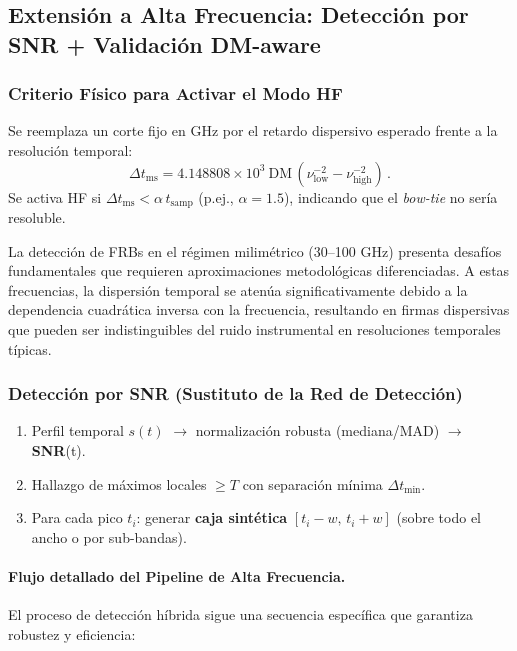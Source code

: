 \subsection{Extensión a Alta Frecuencia: Detección por SNR + Validación DM-aware}

\subsubsection{Criterio Físico para Activar el Modo HF}

Se reemplaza un corte fijo en GHz por el retardo dispersivo esperado frente a la resolución temporal:
\[
\Delta t_{\mathrm{ms}} = 4.148808 \times 10^{3}\ \mathrm{DM}\,(\nu_{\mathrm{low}}^{-2}-\nu_{\mathrm{high}}^{-2}) \, .
\]
Se activa HF si $\Delta t_{\mathrm{ms}} < \alpha\, t_{\mathrm{samp}}$ (p.ej., $\alpha\!=\!1.5$), indicando que el \textit{bow-tie} no sería resoluble.

La detección de FRBs en el régimen milimétrico (30--100 GHz) presenta desafíos fundamentales que requieren aproximaciones metodológicas diferenciadas. A estas frecuencias, la dispersión temporal se atenúa significativamente debido a la dependencia cuadrática inversa con la frecuencia, resultando en firmas dispersivas que pueden ser indistinguibles del ruido instrumental en resoluciones temporales típicas.

\subsubsection{Detección por SNR (Sustituto de la Red de Detección)}

\begin{enumerate}
  \item Perfil temporal $s(t)$ \(\rightarrow\) normalización robusta (mediana/MAD) \(\rightarrow\) \textbf{SNR}(t).
  \item Hallazgo de máximos locales $\ge T$ con separación mínima $\Delta t_{\min}$.
  \item Para cada pico $t_i$: generar \textbf{caja sintética} $[t_i-w,\, t_i+w]$ (sobre todo el ancho o por sub-bandas).
\end{enumerate}

\paragraph{Flujo detallado del Pipeline de Alta Frecuencia.} El proceso de detección híbrida sigue una secuencia específica que garantiza robustez y eficiencia:

